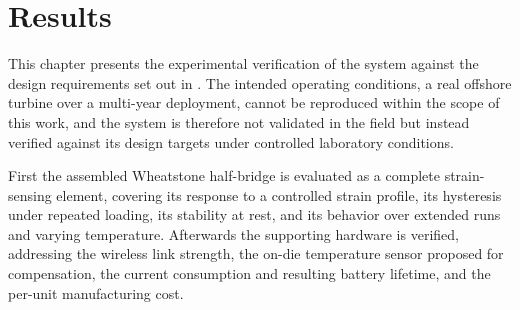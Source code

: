 \chapter{Results} \label{sec:Results}
This chapter presents the experimental verification of the system against the design requirements set out in . The intended operating conditions, a real offshore turbine over a multi-year deployment, cannot be reproduced within the scope of this work, and the system is therefore not validated in the field but instead verified against its design targets under controlled laboratory conditions.
 
First the assembled Wheatstone half-bridge is evaluated as a complete strain-sensing element, covering its response to a controlled strain profile, its hysteresis under repeated loading, its stability at rest, and its behavior over extended runs and varying temperature. Afterwards the supporting hardware is verified, addressing the wireless link strength, the on-die temperature sensor proposed for compensation, the current consumption and resulting battery lifetime, and the per-unit manufacturing cost.

% 

% 

% 

% 

